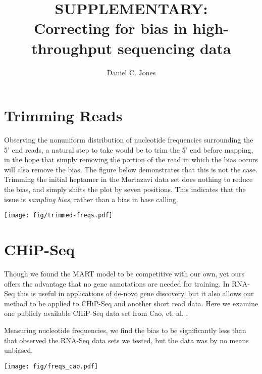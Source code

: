 \documentclass[letterpaper]{article}
\title{SUPPLEMENTARY:\\Correcting for bias in high-throughput sequencing data}
\author{Daniel C. Jones}
\begin{document}
\maketitle





\section{Trimming Reads}

Observing the nonuniform distribution of nucleotide frequencies surrounding the
5' end reads, a natural step to take would be to trim the 5' end before mapping,
in the hope that simply removing the portion of the read in which the bias
occurs will also remove the bias. The figure below demonstrates that this is not
the case. Trimming the initial heptamer in the Mortazavi data set does nothing to
reduce the bias, and simply shifts the plot by seven positions. This indicates
that the issue is \emph{sampling bias}, rather than a bias in base calling.


\begin{center}
\texttt{[image: fig/trimmed-freqs.pdf]}
\end{center}


\section{CHiP-Seq}

Though we found the MART model \cite{Li2010} to be competitive with our own,
yet ours offers the advantage that no gene annotations are needed for training. In
RNA-Seq this is useful in applications of de-novo gene discovery, but it also
allows our method to be applied to CHiP-Seq and another short read data. Here we
examine one publicly available CHiP-Seq data set from Cao, et. al.
\cite{Cao2010}.  

Measuring nucleotide frequencies, we find the bias to be significantly less
than that observed the RNA-Seq data sets we tested, but the data was by no means
unbiased.

\begin{center}
\texttt{[image: fig/freqs\_cao.pdf]}
\end{center}
\end{document}
